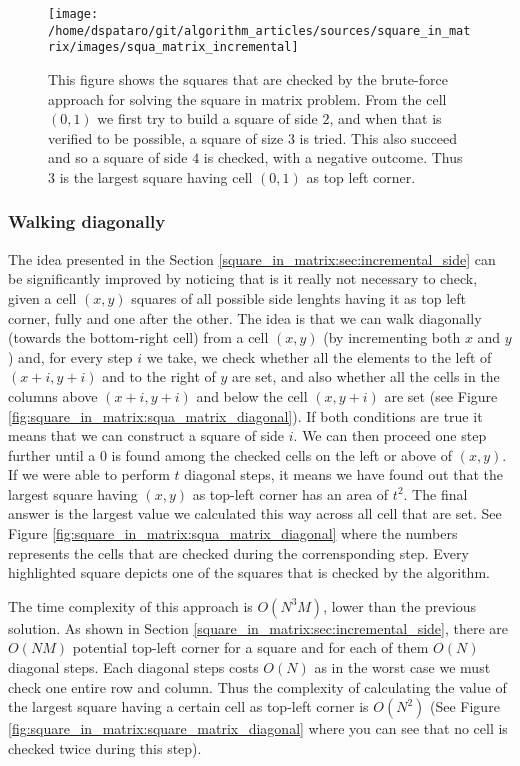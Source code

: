 \begin{figure}
	\centering
	\label{fig:square_in_matrix:squa_matrix_incremental}
	\texttt{[image: /home/dspataro/git/algorithm\_articles/sources/square\_in\_matrix/images/squa\_matrix\_incremental]}
	\caption[Square in matrix - Brute-force incremental square construction.]{This figure shows  the
	squares that are checked by the brute-force approach for solving the square in matrix problem.
	From the cell $(0,1)$ we first try to build a square of side $2$, and when that is verified to
	be possible, a square of size $3$ is tried. This also succeed and so a square of side $4$ is
	checked, with a negative outcome. Thus $3$ is the largest square having cell $(0,1)$ as top left
	corner. }
\end{figure}

\subsubsection{Walking diagonally}
The idea presented in the Section \ref{square_in_matrix:sec:incremental_side} can be significantly
improved by noticing that is it really not necessary to check, given a cell $(x,y)$ squares of all
possible side lenghts having it as top left corner, fully and one after the other. The idea is that
we can walk diagonally (towards the bottom-right cell) from a cell $(x,y)$ (by incrementing both $x$
and $y$) and, for every step $i$ we take, we check whether all the elements to the left of $(x+i,
y+i)$  and to the right of  $y$ are set, and also whether all the cells in the columns above $(x+i,
y+i)$ and below the cell $(x,y+i)$ are set (see Figure
\ref{fig:square_in_matrix:squa_matrix_diagonal}). If both conditions are true it means that we can
construct a square of side $i$. We can then proceed one step further until a $0$ is found among the
checked cells on the left or above of $(x,y)$. If we were able to perform $t$ diagonal steps, it
means we have found out that the largest square having $(x,y)$ as top-left corner has an area of
$t^2$. The final answer is the largest value we calculated this way across all cell that are set.
See Figure \ref{fig:square_in_matrix:squa_matrix_diagonal} where the numbers represents the cells
that are checked during the corrensponding step. Every highlighted square depicts one of the squares
that is checked by the algorithm.


The time complexity of this approach is $O(N^3M)$, lower than the previous solution. As shown in
Section \ref{square_in_matrix:sec:incremental_side}, there are $O(NM)$ potential top-left corner for
a square and for each of them $O(N)$ diagonal steps. Each diagonal steps costs $O(N)$ as in the
worst case we must check one entire row and column. Thus the complexity of calculating the value of
the largest square having a certain cell  as top-left corner is $O(N^2)$ (See Figure
\ref{fig:square_in_matrix:square_matrix_diagonal} where you can see that no cell is checked twice
during this step). 

